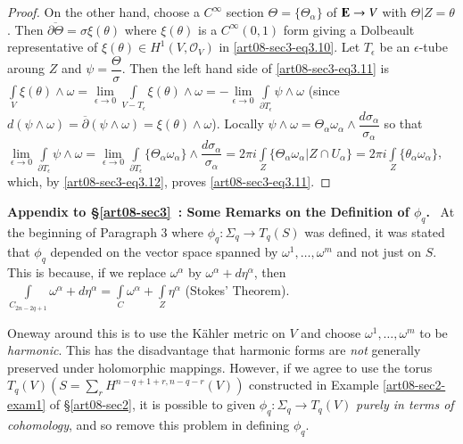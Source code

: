 \begin{proof}
On the other hand, choose a $C^{\infty}$ section $\Theta=\{\Theta_{\alpha}\}$ of $\mathbf{E}\to V$ with $\Theta|Z=\theta$. Then $\overline{\partial \Theta}=\sigma\xi(\theta)$ where $\xi(\theta)$ is a $C^{\infty}(0,1)$ form giving a Dolbeault representative of $\xi(\theta)\in H^{1}(V,\mathscr{O}_{V})$ in \eqref{art08-sec3-eq3.10}. Let $T_{\epsilon}$ be an $\epsilon$-tube aroung $Z$ and $\psi=\dfrac{\Theta}{\sigma}$. Then the left hand side of \eqref{art08-sec3-eq3.11} is $\int\limits_{V}\xi(\theta)\wedge \omega=\lim\limits_{\epsilon\to 0}\int\limits_{V-T_{\epsilon}}\xi(\theta)\wedge \omega=-\lim\limits_{\epsilon\to 0}\int\limits_{\partial T_{\epsilon}}\psi \wedge \omega$ (since $d(\psi\wedge \omega)= \overline{\partial}(\psi\wedge \omega)=\xi(\theta)\wedge \omega$). Locally $\psi\wedge \omega=\Theta_{\alpha}\omega_{\alpha}\wedge \dfrac{d\sigma_{\alpha}}{\sigma_{\alpha}}$ so that 
$\lim\limits_{\epsilon \to 0}\int\limits_{\partial T_{\epsilon}}\psi\wedge \omega=\lim\limits_{\epsilon\to 0}\int\limits_{\partial T_{\epsilon}}\{\Theta_{\alpha}\omega_{\alpha}\}\wedge \dfrac{d\sigma_{\alpha}}{\sigma_{\alpha}}=2\pi i \int\limits_{Z}\{\Theta_{\alpha}\omega_{\alpha}|Z\cap U_{\alpha}\}=2\pi i\int\limits_{Z}\{\theta_{\alpha}\omega_{\alpha}\}$, which, by \eqref{art08-sec3-eq3.12}, proves \eqref{art08-sec3-eq3.11}.
\end{proof}

\medskip
\noindent
{\bf Appendix to \S\ref{art08-sec3}~: Some Remarks on the Definition of {\boldmath$\phi_{q}$}.}~ At the beginning of Paragraph 3 where $\phi_{q}:\Sigma_{q}\to T_{q}(S)$ was defined, it was stated that $\phi_{q}$ depended on the vector space spanned by $\omega^{1},\ldots,\omega^{m}$ and not just on $S$. This is because, if we replace $\omega^{\alpha}$ by $\omega^{\alpha}+d\eta^{\alpha}$, then $\int\limits_{C_{2n-2q+1}}\omega^{\alpha}+d\eta^{\alpha}=\int\limits_{C}\omega^{\alpha}+\int\limits_{Z}\eta^{\alpha}$ (Stokes' Theorem).

One\pageoriginale way around this is to use the K\"ahler metric on $V$ and choose $\omega^{1},\ldots,\omega^{m}$ to be {\em harmonic}. This has the disadvantage that harmonic forms are {\em not} generally preserved under holomorphic mappings. However, if we agree to use the torus $T_{q}(V)(S=\sum\limits_{r}H^{n-q+1+r,n-q-r}(V))$ constructed in Example \ref{art08-sec2-exam1} of \S\ref{art08-sec2}, it is possible to given $\phi_{q}:\Sigma_{q}\to T_{q}(V)$ {\em purely in terms of cohomology}, and so remove this problem in defining $\phi_{q}$.

